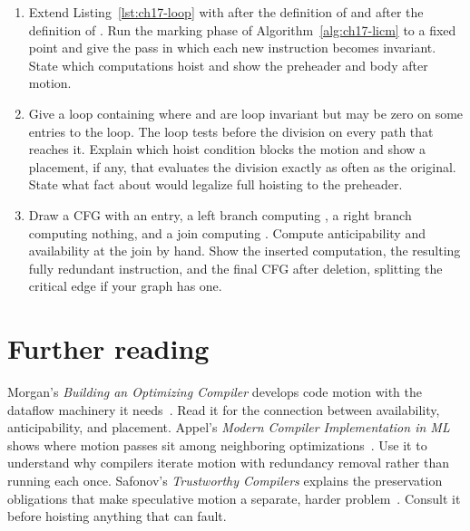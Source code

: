 \begin{enumerate}
  \item \label{ex:ch17-mark-chain}
  Extend Listing~\ref{lst:ch17-loop} with  after the definition of  and  after the definition of .
  Run the marking phase of Algorithm~\ref{alg:ch17-licm} to a fixed point and give the pass in which each new instruction becomes invariant.
  State which computations hoist and show the preheader and body after motion.
  \item \label{ex:ch17-guarded-trap}
  Give a loop containing  where  and  are loop invariant but  may be zero on some entries to the loop.
  The loop tests  before the division on every path that reaches it.
  Explain which hoist condition blocks the motion and show a placement, if any, that evaluates the division exactly as often as the original.
  State what fact about  would legalize full hoisting to the preheader.
  \item \label{ex:ch17-pre-placement}
  Draw a CFG with an entry, a left branch computing , a right branch computing nothing, and a join computing .
  Compute anticipability and availability at the join by hand.
  Show the inserted computation, the resulting fully redundant instruction, and the final CFG after deletion, splitting the critical edge if your graph has one.
\end{enumerate}

\section{Further reading}
\label{sec:ch17-further-reading}

Morgan's \emph{Building an Optimizing Compiler} develops code motion with the dataflow machinery it needs~\cite{morgan-1998-optimizing}.
Read it for the connection between availability, anticipability, and placement.
Appel's \emph{Modern Compiler Implementation in ML} shows where motion passes sit among neighboring optimizations~\cite{appel-1998-modern}.
Use it to understand why compilers iterate motion with redundancy removal rather than running each once.
Safonov's \emph{Trustworthy Compilers} explains the preservation obligations that make speculative motion a separate, harder problem~\cite{safonov-2010-trustworthy}.
Consult it before hoisting anything that can fault.

